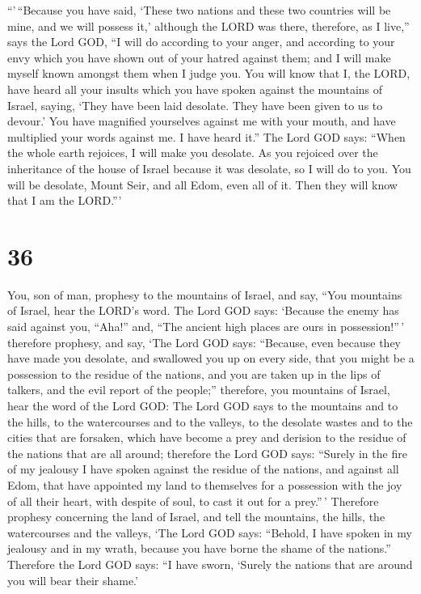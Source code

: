  ``'\,``Because you have said, `These two nations and these
two countries will be mine, and we will possess it,' although the LORD
was there,  therefore, as I live,'' says the Lord GOD, ``I
will do according to your anger, and according to your envy which you
have shown out of your hatred against them; and I will make myself known
amongst them when I judge you.  You will know that I, the
LORD, have heard all your insults which you have spoken against the
mountains of Israel, saying, `They have been laid desolate. They have
been given to us to devour.'  You have magnified yourselves
against me with your mouth, and have multiplied your words against me. I
have heard it.''  The Lord GOD says: ``When the whole earth
rejoices, I will make you desolate.  As you rejoiced over
the inheritance of the house of Israel because it was desolate, so I
will do to you. You will be desolate, Mount Seir, and all Edom, even all
of it. Then they will know that I am the LORD.'''

\hypertarget{section-34}{%
\section{36}\label{section-34}}

 You, son of man, prophesy to the mountains of Israel, and
say, ``You mountains of Israel, hear the LORD's word.  The
Lord GOD says: `Because the enemy has said against you, ``Aha!'' and,
``The ancient high places are ours in possession!''\,' 
therefore prophesy, and say, `The Lord GOD says: ``Because, even because
they have made you desolate, and swallowed you up on every side, that
you might be a possession to the residue of the nations, and you are
taken up in the lips of talkers, and the evil report of the people;''
 therefore, you mountains of Israel, hear the word of the
Lord GOD: The Lord GOD says to the mountains and to the hills, to the
watercourses and to the valleys, to the desolate wastes and to the
cities that are forsaken, which have become a prey and derision to the
residue of the nations that are all around;  therefore the
Lord GOD says: ``Surely in the fire of my jealousy I have spoken against
the residue of the nations, and against all Edom, that have appointed my
land to themselves for a possession with the joy of all their heart,
with despite of soul, to cast it out for a prey.''\,' 
Therefore prophesy concerning the land of Israel, and tell the
mountains, the hills, the watercourses and the valleys, `The Lord GOD
says: ``Behold, I have spoken in my jealousy and in my wrath, because
you have borne the shame of the nations.''  Therefore the
Lord GOD says: ``I have sworn, `Surely the nations that are around you
will bear their shame.'

